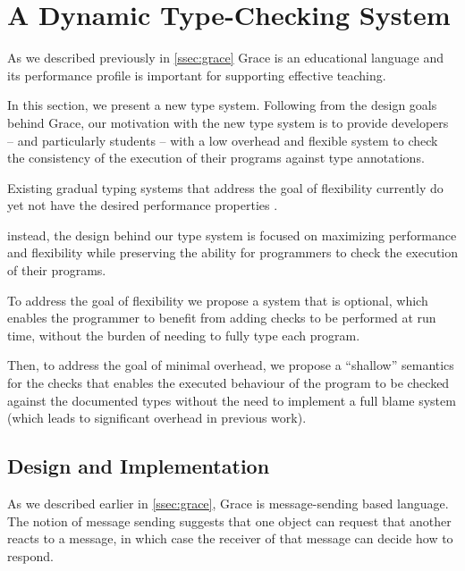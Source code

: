 
\section{A Dynamic Type-Checking System}
\label{sec:method}




As we described previously in \cref{ssec:grace}
Grace is an educational language and its performance profile
is important for supporting effective teaching. 

In this section,
we present a new type system. 
Following from the design goals behind Grace,
our motivation with the new type system
is to provide developers
-- and particularly students --
with a low overhead and flexible system 
to check the consistency of the execution of their programs
against type annotations.

Existing gradual typing systems 
that address the goal of flexibility currently
do yet not have the desired performance properties \cite{Takikawa2016}.

instead, the design behind our type system is focused
on maximizing performance and flexibility while
preserving the ability for programmers to check the execution
of their programs.

To address the goal of flexibility we propose a system that is optional,
which enables the programmer to benefit from adding checks 
to be performed at run time,
without the burden of needing to fully type each program.

Then, to address the goal of minimal overhead, 
we propose a ``shallow'' semantics for the checks
that enables the executed behaviour of the program to be checked against
the documented types without the need to implement a full blame system 
(which leads to significant overhead in previous work).


\subsection{Design and Implementation}

As we described earlier in \cref{ssec:grace}, Grace is message-sending based language.
The notion of message sending suggests that one object can request that another reacts to a message,
in which case the receiver of that message can decide how to respond.

